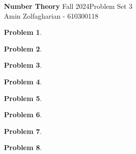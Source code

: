 \documentclass[12pt]{article}
\newcommand{\customanswer}[1]{%
\begin{problem}
\end{problem}

}
\newtheorem{problem}{Problem}
\begin{document}
\noindent \textbf{Number Theory} Fall 2024\hfill Problem Set 3\\
Amin Zolfagharian - 610300118

\hrulefill

\customanswer{1}
\customanswer{2}
\customanswer{3}
\customanswer{4}
\customanswer{5}
\customanswer{6}
\customanswer{7}
\newpage
\customanswer{8}
\end{document}
